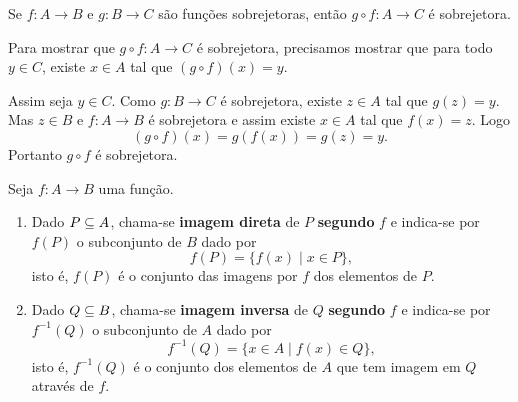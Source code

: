 \begin{proposicao}
	Se $f : A \to B$ e $g : B \to C$ s{\~a}o fun\c{c}\~oes sobrejetoras, ent{\~a}o $g\circ f : A \to C$ {\'e} sobrejetora.
\end{proposicao}
\begin{prova}
 	Para mostrar que $g \circ f : A \to C$ \'e sobrejetora, precisamos mostrar que para todo $y \in C$, existe $x \in A$ tal que $(g\circ f)(x) = y$.

 	Assim seja $y \in C$. Como $g : B \to C$ \'e sobrejetora, existe $z \in A$ tal que $g(z) = y$. Mas $z \in B$ e $f : A \to B$ \'e sobrejetora e assim existe $x \in A$ tal que $f(x) = z$. Logo
 	\[
 		(g\circ f)(x) = g(f(x)) = g(z) = y.
 	\]
 	Portanto $g \circ f$ \'e sobrejetora.
\end{prova}

\begin{definicao}
	Seja $f : A \to B$ uma fun{\c c}{\~a}o.
	\begin{enumerate}[label={\roman*})]
		\item Dado $P \subseteq A$, chama-se \textbf{imagem direta} de $P$  \textbf{segundo} $f$ e indica-se por $f(P)$ o subconjunto de $B$ dado por
		\[
			f(P) = \{f(x) \mid x \in P\},
		\]
		isto {\'e}, $f(P)$ {\'e} o conjunto das imagens por $f$ dos elementos de $P$.

		\item Dado $Q \subseteq B$, chama-se \textbf{imagem inversa} de $Q$ \textbf{segundo} $f$ e indica-se por $f^{-1}(Q)$ o subconjunto de $A$ dado por
		\[
			f^{-1}(Q) = \{x \in A \mid f(x) \in Q\},
		\]
		isto {\'e}, $f^{-1}(Q)$ {\'e} o conjunto dos elementos de $A$ que tem imagem em $Q$ atrav{\'e}s de $f$.
	\end{enumerate}
\end{definicao}

